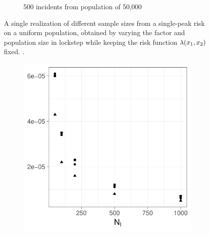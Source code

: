 \begin{figure}[htbp]
\begin{subfigure}{0.45\textwidth}
        \caption{500 incidents from population of 50,000}
    \end{subfigure}
    \caption[Example realizations showing sample size]
        {A single realization of different sample sizes from a single-peak risk on a uniform population, obtained by varying the \gls{factor} and population size in lockstep while keeping the risk function $\lambda (x_1, x_2)$ fixed.
        \scatterplotcaption.}
    \label{fig:one_sample:unifNpop_1h}
\end{figure}

\begin{figure}[htbp]
    \centering
    \begin{subfigure}[b]{0.49\textwidth}
        \includegraphics[width=\textwidth]{results/by_pop_size/MISE-vs-population}
        \caption{}
        \label{fig:ise:unifNpop_1h:mise}
    \end{subfigure}
    \begin{subfigure}[b]{0.49\textwidth}

\end{subfigure}
\end{figure}
